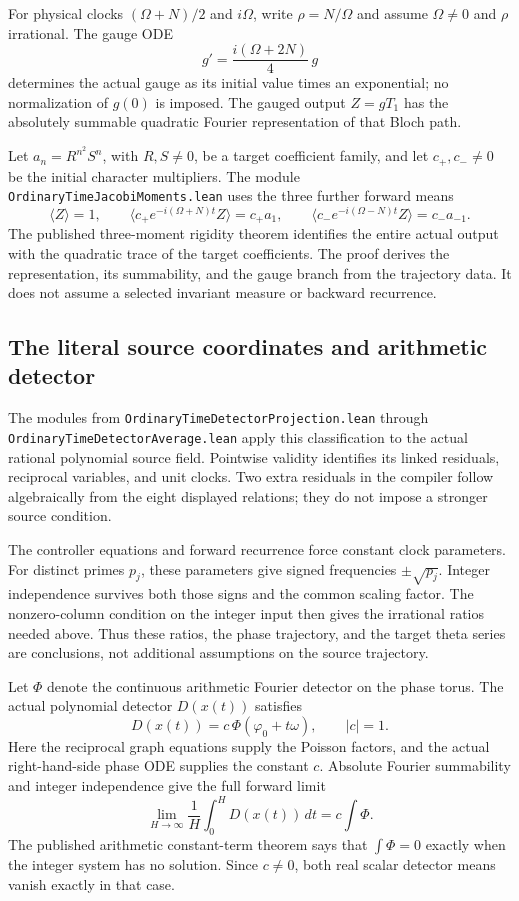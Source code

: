 \documentclass[11pt]{article}
\newcommand{\code}[1]{{\small\nolinkurl{#1}}}
\begin{document}
For physical clocks $(\Omega+N)/2$ and $i\Omega$, write
$\rho=N/\Omega$ and assume $\Omega\ne0$ and $\rho$ irrational. The gauge
ODE
\[
 g'=\frac{i(\Omega+2N)}4\,g
\]
determines the actual gauge as its initial value times an exponential;
no normalization of $g(0)$ is imposed. The gauged output $Z=gT_1$ has the
absolutely summable quadratic Fourier representation of that Bloch path.

Let $a_n=R^{n^2}S^n$, with $R,S\ne0$, be a target coefficient family, and
let $c_+,c_-\ne0$ be the initial character multipliers. The module
\code{OrdinaryTimeJacobiMoments.lean} uses the three further forward means
\[
 \langle Z\rangle=1,\qquad
 \langle c_+e^{-i(\Omega+N)t}Z\rangle=c_+a_1,\qquad
 \langle c_-e^{-i(\Omega-N)t}Z\rangle=c_-a_{-1}.
\]
The published three-moment rigidity theorem identifies the entire actual
output with the quadratic trace of the target coefficients. The proof
derives the representation, its summability, and the gauge branch from
the trajectory data. It does not assume a selected invariant measure or
backward recurrence.

\subsection{The literal source coordinates and arithmetic detector}

The modules from \code{OrdinaryTimeDetectorProjection.lean} through
\code{OrdinaryTimeDetectorAverage.lean} apply this classification to the
actual rational polynomial source field. Pointwise validity identifies
its linked residuals, reciprocal variables, and unit clocks. Two extra
residuals in the compiler follow algebraically from the eight displayed
relations; they do not impose a stronger source condition.

The controller equations and forward recurrence force constant clock
parameters. For distinct primes $p_j$, these parameters give signed
frequencies $\pm\sqrt{p_j}$. Integer independence survives both those
signs and the common scaling factor. The nonzero-column condition on the
integer input then gives the irrational ratios needed above. Thus these
ratios, the phase trajectory, and the target theta series are conclusions,
not additional assumptions on the source trajectory.

Let $\Phi$ denote the continuous arithmetic Fourier detector on the
phase torus. The actual polynomial detector $D(x(t))$ satisfies
\[
 D(x(t))=c\,\Phi(\varphi_0+t\omega),\qquad |c|=1.
\]
Here the reciprocal graph equations supply the Poisson factors, and the
actual right-hand-side phase ODE supplies the constant $c$. Absolute
Fourier summability and integer independence give the full forward limit
\[
 \lim_{H\to\infty}\frac1H\int_0^H D(x(t))\,dt
 =c\int\Phi.
\]
The published arithmetic constant-term theorem says that $\int\Phi=0$
exactly when the integer system has no solution. Since $c\ne0$, both
real scalar detector means vanish exactly in that case.
\end{document}
